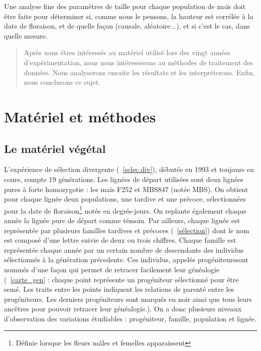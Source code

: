 \documentclass[12pt,a4paper]{article}
\begin{document}
					Une analyse fine des paramètres de taille pour chaque population de maïs doit être faite pour déterminer si, comme nous le pensons, la hauteur est corrélée à la date de floraison, et de quelle façon (causale, aléatoire...), et si c'est le cas, dans quelle mesure.
					
			\begin{quotation}
				Après nous êtres intéressés au matériel utilisé lors des vingt années d'expérimentation, nous nous intéresserons au méthodes de traitement des données. Nous analyserons ensuite les résultats et les interpréterons. Enfin, nous conclurons ce sujet.
			\end{quotation}
			
			
			 \section{Matériel et méthodes}
			 		
			 		\subsection{Le matériel végétal}
			 			
			 			L'expérience de sélection divergente (~\ref{selec.div}), débutée en 1993 et toujours en cours, compte 19 générations. Les lignées de départ utilisées sont deux lignées pures à forte homozygotie : les maïs F252 et MBS847 (notée MBS). On obtient pour chaque lignée deux populations, une tardive et une précoce, sélectionnées pour la date de floraison\footnote{Définie lorsque les fleurs mâles et femelles apparaissent} notée en degrés-jours. On replante également chaque année la lignée pure de départ comme témoin.
			 			Par ailleurs, chaque lignée est représentée par plusieurs familles tardives et précoces (~\ref{sélection}) dont le nom est composé d'une lettre suivie de deux ou trois chiffres. Chaque famille est représentée chaque année par un certain nombre de descendants des individus sélectionnés à la génération précedente. Ces individus, appelés \og progéniteurs\fg sont nommés d'une façon qui permet de retracer facilement leur généalogie (~\ref{carte_gen} : chaque point représente un progéniteur sélectionné pour être semé. Les traits entre les points indiquent les relations de parenté entre les progéniteurs. Les derniers progéniteurs sont marqués en noir ainsi que tous leurs ancêtres pour pouvoir retracer leur généalogie.). On a donc plusieurs niveaux d'observation des variations étudiables : progéniteur, famille, population et lignée.
			 			
\end{document}
